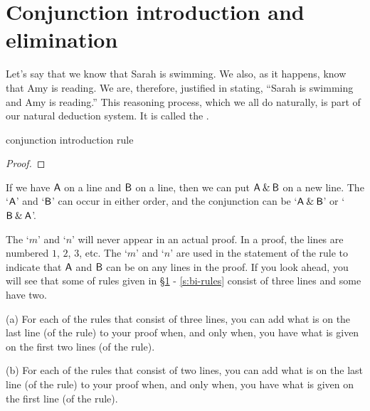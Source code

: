\section{Conjunction introduction and elimination}\label{s:conj-rule}

Let's say that we know that Sarah is swimming. We also, as it happens, know that Amy is reading. We are, therefore, justified in stating, ``Sarah is swimming and Amy is reading.'' 
This reasoning process, which we all do naturally, is part of our natural deduction system. It is called the . 
\begin{factboxy}{conjunction introduction rule}
\begin{proof}
	 
\end{proof}

\small{If we have $\mathsf{A}$ on a line and $\mathsf{B}$ on a line, then we can put $\mathsf{A}\mathbin{\&}\mathsf{B}$ on a new line. The `$\mathsf{A}$' and `$\mathsf{B}$' can occur in either order, and the conjunction can be `$\mathsf{A} \mathbin{\&} \mathsf{B}$' or `$\mathsf{B} \mathbin{\&} \mathsf{A}$'.}
\end{factboxy}


The `$m$' and `$n$' will never appear in an actual proof. In a proof, the lines are numbered $1$, $2$, $3$, etc.  The `$m$' and `$n$' are used in the statement of the rule to indicate that $\mathsf{A}$ and $\mathsf{B}$ can be on any lines in the proof.
If you look ahead, you will see that some of rules given in \S \ref{s:conj-rule} - \ref{s:bi-rules} consist of three lines and some have two. 
\begin{earg}
\item[(a)] For each of the rules that consist of three lines, you can add what is on the last line (of the rule) to your proof when, and only when, you have what is given on the first two lines (of the rule).
\item[(b)] For each of the rules that consist of two lines, you can add what is on the last line (of the rule) to your proof when, and only when, you have what is given on the first line (of the rule).
\end{earg}

